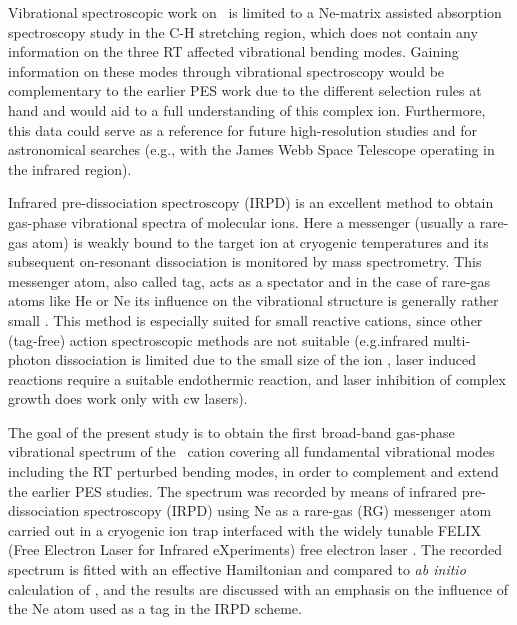 Vibrational spectroscopic work on \ion\ is limited to a Ne-matrix assisted absorption spectroscopy study in the C-H stretching region\cite{Smith-Gicklhorn2001VibrationalCations}, which does not contain any information on the three RT affected vibrational bending modes. Gaining information on these modes through vibrational spectroscopy would be complementary to the earlier PES work due to the different selection rules at hand and would aid to a full understanding of this complex ion. Furthermore, this data could serve as a reference for future high-resolution studies and for astronomical searches (e.g., with the James Webb Space Telescope operating in the infrared region).

Infrared pre-dissociation spectroscopy (IRPD) is an excellent method to obtain gas-phase vibrational spectra of molecular ions. Here a messenger (usually a rare-gas atom) is weakly bound to the target ion at cryogenic temperatures and its subsequent on-resonant dissociation is monitored by mass spectrometry. This messenger atom, also called tag, acts as a spectator and in the case of rare-gas atoms like He or Ne its influence on the vibrational structure is generally rather small \cite{Marimuthu2020LaboratorySpectroscopy, Marimuthu2021InfraredCH3CNH+, Rap2020StableSpectroscopy}.   
This method is especially suited for small reactive cations, since other (tag-free) action spectroscopic methods are not suitable \cite{Roithovareview}(e.g.infrared multi-photon dissociation is limited due to the small size of the ion \cite{Jasikova2018,Brodbelt2009}, laser induced reactions \cite{schlemmer_laser_2002} require a suitable endothermic reaction,  and laser inhibition of complex growth \cite{Chakrabarty2013, Asvany2015} does work only with cw lasers). 

The goal of the present study is to obtain the first broad-band gas-phase vibrational spectrum of the \ion\ cation covering all fundamental vibrational modes including the RT perturbed bending modes, in order to complement and extend  the earlier PES studies. 
The spectrum was recorded by means of infrared pre-dissociation spectroscopy (IRPD) using Ne as a rare-gas (RG) messenger atom carried out in a cryogenic ion trap interfaced with the widely tunable FELIX (Free Electron Laser for Infrared eXperiments) \cite{oepts_free-electron-laser_1995} free electron laser \cite{jusko_felion_2019}. 
The recorded spectrum is fitted with an effective Hamiltonian and compared to \emph{ab initio} calculation of \citet{Dai2015TheCalculations}, and the results are discussed with an emphasis on the influence of the Ne atom used as a tag in the IRPD scheme.


